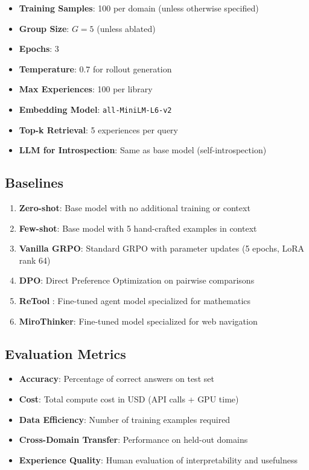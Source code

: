 \documentclass[11pt,a4paper]{article}
\begin{document}
\begin{itemize}
    \item \textbf{Training Samples}: 100 per domain (unless otherwise specified)
    \item \textbf{Group Size}: $G = 5$ (unless ablated)
    \item \textbf{Epochs}: 3
    \item \textbf{Temperature}: 0.7 for rollout generation
    \item \textbf{Max Experiences}: 100 per library
    \item \textbf{Embedding Model}: \texttt{all-MiniLM-L6-v2}
    \item \textbf{Top-k Retrieval}: 5 experiences per query
    \item \textbf{LLM for Introspection}: Same as base model (self-introspection)
\end{itemize}

\subsection{Baselines}

\begin{enumerate}
    \item \textbf{Zero-shot}: Base model with no additional training or context
    \item \textbf{Few-shot}: Base model with 5 hand-crafted examples in context
    \item \textbf{Vanilla GRPO}: Standard GRPO with parameter updates (5 epochs, LoRA rank 64)
    \item \textbf{DPO}: Direct Preference Optimization on pairwise comparisons
    \item \textbf{ReTool} \cite{retool}: Fine-tuned agent model specialized for mathematics
    \item \textbf{MiroThinker}: Fine-tuned model specialized for web navigation
\end{enumerate}

\subsection{Evaluation Metrics}

\begin{itemize}
    \item \textbf{Accuracy}: Percentage of correct answers on test set
    \item \textbf{Cost}: Total compute cost in USD (API calls + GPU time)
    \item \textbf{Data Efficiency}: Number of training examples required
    \item \textbf{Cross-Domain Transfer}: Performance on held-out domains
    \item \textbf{Experience Quality}: Human evaluation of interpretability and usefulness
\end{itemize}
\end{document}
